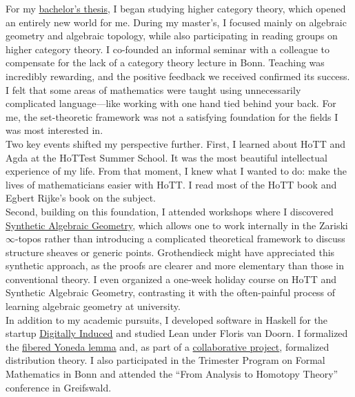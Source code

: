 \documentclass[12pt,headings=small,paper=A4,DIV=calc]{article}
\begin{document}
For my \href{https://uni-bonn.sciebo.de/s/PJUqHE52SnCKJMy}{bachelor's thesis}, I began studying higher category theory, which opened an entirely new world for me. During my master's, I focused mainly on algebraic geometry and algebraic topology, while also participating in reading groups on higher category theory. I co-founded an informal seminar with a colleague to compensate for the lack of a category theory lecture in Bonn. Teaching was incredibly rewarding, and the positive feedback we received confirmed its success. \\
I felt that some areas of mathematics were taught using unnecessarily complicated language---like working with one hand tied behind your back. For me, the set-theoretic framework was not a satisfying foundation for the fields I was most interested in. \\
Two key events shifted my perspective further. First, I learned about HoTT and Agda at the HoTTest Summer School. It was the most beautiful intellectual experience of my life. From that moment, I knew what I wanted to do: make the lives of mathematicians easier with HoTT. I read most of the HoTT book and Egbert Rijke's book on the subject. \\

Second, building on this foundation, I attended workshops where I discovered \href{https://github.com/felixwellen/synthetic-zariski}{Synthetic Algebraic Geometry}, which allows one to work internally in the Zariski $\infty$-topos rather than introducing a complicated theoretical framework to discuss structure sheaves or generic points. Grothendieck might have appreciated this synthetic approach, as the proofs are clearer and more elementary than those in conventional theory. I even organized a one-week holiday course on HoTT and Synthetic Algebraic Geometry, contrasting it with the often-painful process of learning algebraic geometry at university. \\

In addition to my academic pursuits, I developed software in Haskell for the startup \href{https://www.digitallyinduced.com/}{Digitally Induced} and studied Lean under Floris van Doorn. I formalized the \href{https://github.com/timlichtnau/LeanCourse23/tree/master/LeanCourse/Project}{fibered Yoneda lemma} and, as part of a \href{https://github.com/timlichtnau/BonnAnalysis/tree/master/BonnAnalysis}{collaborative project}, formalized distribution theory. I also participated in the Trimester Program on Formal Mathematics in Bonn and attended the ``From Analysis to Homotopy Theory'' conference in Greifswald. \\
\end{document}
